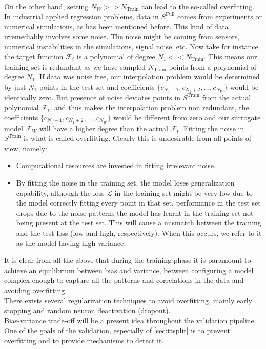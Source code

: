 \indent On the other hand, setting $N_W>>N_{\text{Train}}$ can lead to the so-called overfitting. In industrial applied regression problems, data in $S^\text{Full}$ comes from experiments or numerical simulations, as has been mentioned before. This kind of data irremediably involves some noise. The noise might be coming from sensors, numerical instabilities in the simulations, signal noise, etc. Now take for instance the target function $\mathcal{F}_t$ is a polynomial of degree $N_1<<N_{\text{Train}}$. This means our training set is redundant as we have sampled $N_\text{Train}$ points from a polynomial of degree $N_1$. If data was noise free, our interpolation problem would be determined by just $N_1$ points in the test set and coefficients $\{c_{N_1+1},c_{N_1+2},\ldots,c_{N_W}\}$ would be identically zero. But presence of noise deviates points in $S^\text{Train}$ from the actual polynomial $\mathcal{F}_t$, and thus makes the interpolation problem non redundant, \ie the coefficients $\{c_{N_1+1},c_{N_1+2},\ldots,c_{N_W}\}$ would be different from zero and our surrogate model $\mathcal{{F}}_W$ will have a higher degree than the actual $\mathcal{F}_t$. Fitting the noise in $S^\text{Train}$ is what is called overfitting. Clearly this is undesirable from all points of view, namely:
\begin{itemize}
	\item Computational resources are invested in fitting irrelevant noise.
	\item By fitting the noise in the training set, the model loses generalization capability, \ie although the loss $\mathcal{L}$ in the training set might be very low due to the model correctly fitting every point in that set, performance in the test set drops due to the noise patterns the model has learnt in the training set not being present at the test set. This will cause a mismatch between the training and the test loss (low and high, respectively). When this occurs, we refer to it as the model having high variance.
\end{itemize}

It is clear from all the above that during the training phase it is paramount to achieve an equilibrium between bias and variance, \ie between configuring a model complex enough to capture all the patterns and correlations in the data and avoiding overfitting.\\
%
\indent There exists several regularization techniques to avoid overfitting, mainly early stopping and random neuron deactivation (dropout)\cite{Marsland2015Machine}.\\
%
\indent Bias-variance trade-off will be a present idea throughout the validation pipeline. One of the goals of the validation, especially of \autoref{sec:ttsplit} is to prevent overfitting and to provide mechanisms to detect it.


